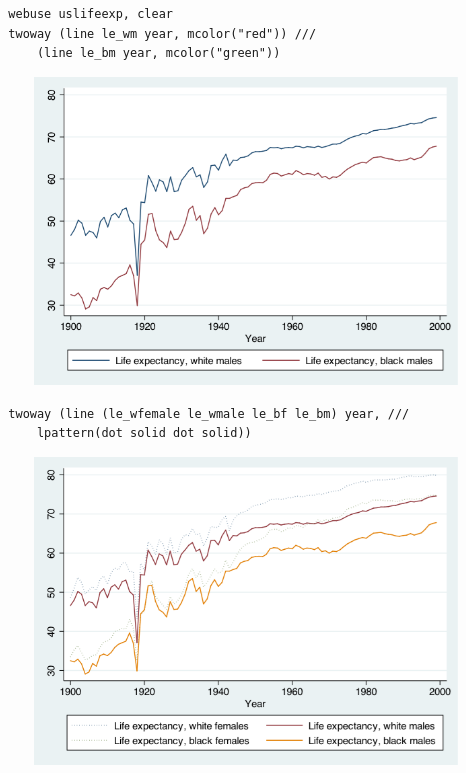\documentclass[]{book}
\begin{document}
\begin{verbatim}
  webuse uslifeexp, clear
  twoway (line le_wm year, mcolor("red")) ///
      (line le_bm year, mcolor("green"))
\end{verbatim}

\begin{figure}
\centering
\includegraphics{Stata/StataModGraph/images/lineGraph1.png}
\caption{}
\end{figure}

\begin{verbatim}
  twoway (line (le_wfemale le_wmale le_bf le_bm) year, ///
      lpattern(dot solid dot solid))
\end{verbatim}

\begin{figure}
\centering
\includegraphics{Stata/StataModGraph/images/linegraph2.png}
\caption{}
\end{figure}
\end{document}
